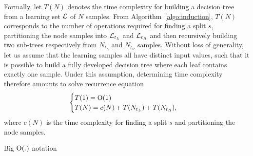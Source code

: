 Formally, let $T(N)$ denotes the time complexity for building a decision tree from a
learning set ${\cal L}$ of $N$ samples. From Algorithm~\ref{algo:induction},
$T(N)$ corresponds to the number of operations required for finding a split $s$, partitioning the
node samples into ${\cal L}_{t_L}$ and ${\cal L}_{t_R}$ and then recursively
building two sub-trees respectively from $N_{t_L}$ and $N_{t_R}$ samples. Without
loss of generality, let us assume that the learning samples all have distinct
input values, such that it is possible to build a fully developed decision tree
where each leaf contains exactly one sample. Under this assumption, determining
time complexity therefore amounts to solve recurrence equation
\begin{equation}
\begin{cases}
T(1) = \operatorname{O}(1) \\
T(N) = c(N) + T(N_{t_L}) + T(N_{t_R}),
\end{cases}
\end{equation}
where $c(N)$ is the time complexity for finding a split $s$ and partitioning
the node samples.




\begin{remark}{Big $\operatorname{O}(.)$ notation}
\end{remark}





